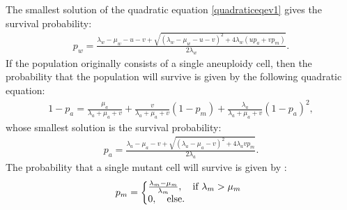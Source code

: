 \documentclass[11pt,a4paper]{article}
\begin{document}
 The smallest solution of the quadratic equation \eqref{quadraticeqev1} gives the survival probability:
\begin{align}\label{survprobw}
p_w=\frac{\lambda_w-\mu_w-u-v+\sqrt{\left(\lambda_w-\mu_w-u-v\right)^2+4\lambda_w\left(up_a+vp_m\right)}}{2\lambda_w}.
\end{align}
If the population originally consists of a single aneuploidy cell, then the probability that the population will survive is given by the following quadratic equation:
\begin{align}
1-p_a=\frac{\mu_a}{\lambda_a+\mu_a+v}+\frac{v}{\lambda_a+\mu_a+v}\left(1-p_m\right)+\frac{\lambda_a}{\lambda_a+\mu_a+v}\left(1-p_a\right)^2,
\end{align}
whose smallest solution is the survival probability:
\begin{align}\label{survproba}
p_a=\frac{\lambda_a-\mu_a-v+\sqrt{\left(\lambda_a-\mu_a-v\right)^2+4\lambda_avp_m}}{2\lambda_a}.
\end{align}
The probability that a single mutant cell will survive is given by \cite{allen2010introduction}:
\begin{equation}
p_m=\left\{
  \begin{array}{@{}ll@{}}
  \frac{\lambda_m-\mu_m}{\lambda_m},\quad\text{if }\lambda_m>\mu_m \\
   0,\quad\text{else}.
  \end{array}\right.
  \end{equation}
\end{document}
